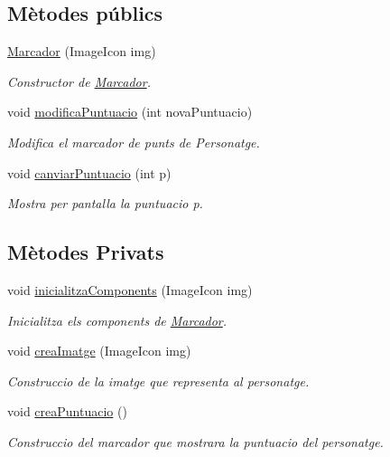 \subsection*{Mètodes públics}
\begin{DoxyCompactItemize}
\item 
\hyperlink{classinterficie_1_1components_1_1_marcador_a8b4cf429f94a2849e1bd19b1e214316c}{Marcador} (Image\+Icon img)
\begin{DoxyCompactList}\small\item\em Constructor de \hyperlink{classinterficie_1_1components_1_1_marcador}{Marcador}. \end{DoxyCompactList}\item 
void \hyperlink{classinterficie_1_1components_1_1_marcador_a6245a05c281278ed2f1c6d95af57dd59}{modifica\+Puntuacio} (int nova\+Puntuacio)
\begin{DoxyCompactList}\small\item\em Modifica el marcador de punts de Personatge. \end{DoxyCompactList}\item 
void \hyperlink{classinterficie_1_1components_1_1_marcador_a69146e4f9b355cfd411a0e7de3c57114}{canviar\+Puntuacio} (int p)
\begin{DoxyCompactList}\small\item\em Mostra per pantalla la puntuacio p. \end{DoxyCompactList}\end{DoxyCompactItemize}
\subsection*{Mètodes Privats}
\begin{DoxyCompactItemize}
\item 
void \hyperlink{classinterficie_1_1components_1_1_marcador_af68b294caf644dd8d684990098801d31}{inicialitza\+Components} (Image\+Icon img)
\begin{DoxyCompactList}\small\item\em Inicialitza els components de \hyperlink{classinterficie_1_1components_1_1_marcador}{Marcador}. \end{DoxyCompactList}\item 
void \hyperlink{classinterficie_1_1components_1_1_marcador_a1f7ef632d7bc455a756bcecfe61a9560}{crea\+Imatge} (Image\+Icon img)
\begin{DoxyCompactList}\small\item\em Construccio de la imatge que representa al personatge. \end{DoxyCompactList}\item 
void \hyperlink{classinterficie_1_1components_1_1_marcador_a56c3f7d8a42f4032d040448fd4c079cf}{crea\+Puntuacio} ()
\begin{DoxyCompactList}\small\item\em Construccio del marcador que mostrara la puntuacio del personatge. \end{DoxyCompactList}\end{DoxyCompactItemize}


